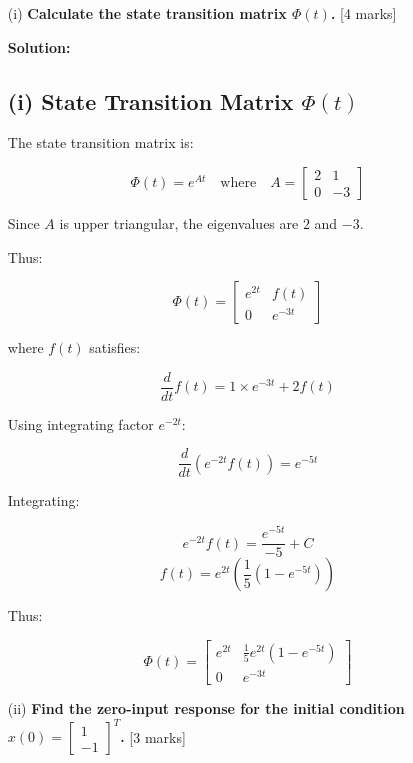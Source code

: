 \documentclass[12pt]{article}
\begin{document}
\begin{enumerate}
		\begin{enumerate}
			\item[(i)] \textbf{Calculate the state transition matrix \( \Phi(t) \).} \hfill [4 marks]
			
			\textbf{Solution:} \\
			
			
			
			\subsection*{(i) State Transition Matrix \(\Phi(t)\)}
			
			The state transition matrix is:
			
			\[
			\Phi(t) = e^{At}
			\quad \text{where} \quad A = 
			\begin{bmatrix}
				2 & 1 \\ 
				0 & -3
			\end{bmatrix}
			\]
			
			Since \(A\) is upper triangular, the eigenvalues are \(2\) and \(-3\).
			
			Thus:
			
			\[
			\Phi(t) = 
			\begin{bmatrix}
				e^{2t} & f(t) \\ 
				0 & e^{-3t}
			\end{bmatrix}
			\]
			
			where \(f(t)\) satisfies:
			
			\[
			\frac{d}{dt} f(t) = 1 \times e^{-3t} + 2f(t)
			\]
			
			Using integrating factor \(e^{-2t}\):
			
			\[
			\frac{d}{dt}\left( e^{-2t} f(t) \right) = e^{-5t}
			\]
			
			Integrating:
			
			\[
			e^{-2t} f(t) = \frac{e^{-5t}}{-5} + C
			\]
			\[
			f(t) = e^{2t} \left( \frac{1}{5}(1 - e^{-5t}) \right)
			\]
			
			Thus:
			
			\[
			\boxed{
				\Phi(t) = 
				\begin{bmatrix}
					e^{2t} & \frac{1}{5}e^{2t}(1 - e^{-5t}) \\ 
					0 & e^{-3t}
				\end{bmatrix}
			}
			\]
			
			
			\item[(ii)] \textbf{Find the zero-input response for the initial condition \( x(0) = \begin{bmatrix} 1 \\ -1 \end{bmatrix}^T \).} \hfill [3 marks]
			

\end{enumerate}
\end{enumerate}
\end{document}
